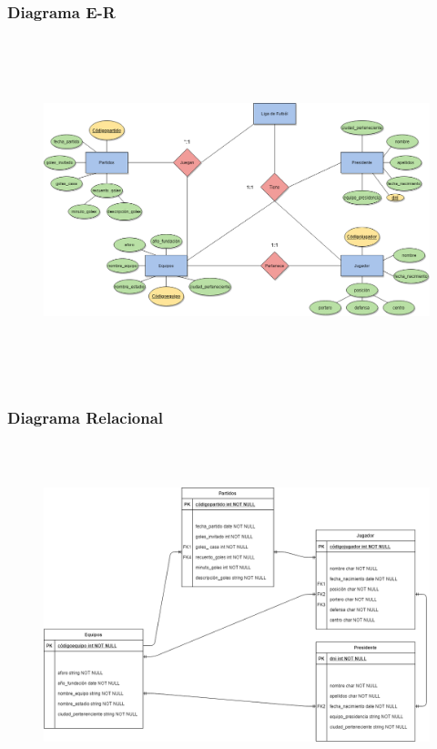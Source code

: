 \documentclass[a4paper, 12pt]{article}
\begin{document}
\begin{justify}
        \subsubsection{Diagrama E-R}
        \begin{figure}[H]
            \centering
            \includegraphics[width=16cm,height=10cm]{er5.png}
        \end{figure}
        \subsubsection{Diagrama Relacional}
        \begin{figure}[H]
            \centering
            \includegraphics[width=16cm,height=10cm]{rel5.png}
        \end{figure}

\end{justify}
\end{document}

